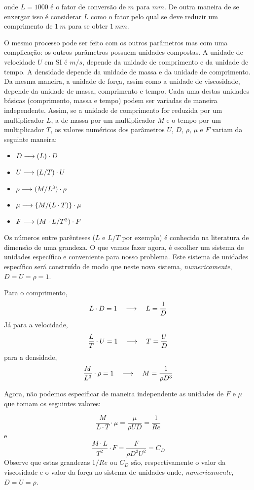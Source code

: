 onde $L = 1000$ é o fator de conversão de $m$ para $mm$. De outra maneira de se enxergar isso é considerar $L$ como o fator pelo qual se deve reduzir um comprimento de $1\:m$ para se obter $1\:mm$.

O mesmo processo pode ser feito com os outros parâmetros mas com uma complicação: os outros parâmetros possuem unidades compostas. A unidade de velocidade $U$ em SI é $m/s$, depende da unidade de comprimento e da unidade de tempo. A densidade depende da unidade de massa e da unidade de comprimento. Da mesma maneira, a unidade de força, assim como a unidade de viscosidade,  depende da unidade de massa, comprimento e tempo. Cada uma destas unidades básicas (comprimento, massa e tempo) podem ser variadas de maneira independente. Assim, se a unidade de comprimento for reduzida por um multiplicador $L$, a de massa por um multiplicador $M$ e o tempo por um multiplicador $T$, os valores numéricos dos parâmetros $U$, $D$, $\rho$, $\mu$ e $F$ variam da seguinte maneira:

\begin{itemize}
\item $D \longrightarrow (L) \cdot D$
\item $U \longrightarrow (L/T) \cdot U$
\item $\rho \longrightarrow  (M/L^3) \cdot\rho$
\item $\mu \longrightarrow \{M/(L\cdot T)\}\cdot\mu$
\item $F \longrightarrow (M \cdot L / T^2) \cdot F$
\end{itemize}

Os números entre parênteses ($L$ e $L/T$ por exemplo) é conhecido na literatura de dimensão de uma grandeza. O que vamos fazer agora, é escolher um sistema de unidades específico e conveniente para nosso problema. Este sistema de unidades específico será construído de modo que neste novo sistema, \emph{numericamente}, $D = U = \rho = 1$.

Para o comprimento,
\[
L \cdot D = 1 \quad\longrightarrow\quad L = \frac{1}{D}
\]
Já para a velocidade,
\[
\frac{L}{T} \cdot U = 1 \quad\longrightarrow\quad T = \frac{U}{D}
\]
para a densidade,
\[
\frac{M}{L^3} \cdot \rho = 1 \quad\longrightarrow\quad M = \frac{1}{\rho D^3}
\]

Agora, não podemos especificar de maneira independente as unidades de $F$ e $\mu$ que tomam os seguintes valores:

\[
\frac{M}{L\cdot T} \cdot \mu = \frac{\mu}{\rho U D} = \frac{1}{Re}
\]
e
\[
\frac{M\cdot L}{T^2} \cdot F = \frac{F}{\rho D^2 U^2} = C_D
\]
Observe que estas grandezas $1/Re$ ou $C_D$ são, respectivamente o valor da viscosidade e o valor da força no sistema de unidades onde, \emph{numericamente},  $D = U = \rho$.

